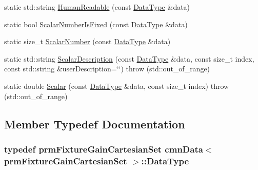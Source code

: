 \begin{DoxyCompactItemize}
\item 
static std\-::string \hyperlink{classcmn_data_3_01prm_fixture_gain_cartesian_set_01_4_a8ba414fbdc7eddcb915dcf54f9168201}{Human\-Readable} (const \hyperlink{classcmn_data_3_01prm_fixture_gain_cartesian_set_01_4_acc465bb24d169f220385b16e38a8e7ea}{Data\-Type} \&data)
\item 
static bool \hyperlink{classcmn_data_3_01prm_fixture_gain_cartesian_set_01_4_a2a449144596cb816b46b1fdacf6480ea}{Scalar\-Number\-Is\-Fixed} (const \hyperlink{classcmn_data_3_01prm_fixture_gain_cartesian_set_01_4_acc465bb24d169f220385b16e38a8e7ea}{Data\-Type} \&data)
\item 
static size\-\_\-t \hyperlink{classcmn_data_3_01prm_fixture_gain_cartesian_set_01_4_ad0e24bf44b0afb6895d09e817cfe85ec}{Scalar\-Number} (const \hyperlink{classcmn_data_3_01prm_fixture_gain_cartesian_set_01_4_acc465bb24d169f220385b16e38a8e7ea}{Data\-Type} \&data)
\item 
static std\-::string \hyperlink{classcmn_data_3_01prm_fixture_gain_cartesian_set_01_4_a02f2135145799af3c1fe4cfd641bb224}{Scalar\-Description} (const \hyperlink{classcmn_data_3_01prm_fixture_gain_cartesian_set_01_4_acc465bb24d169f220385b16e38a8e7ea}{Data\-Type} \&data, const size\-\_\-t index, const std\-::string \&user\-Description=\char`\"{}\char`\"{})  throw (std\-::out\-\_\-of\-\_\-range)
\item 
static double \hyperlink{classcmn_data_3_01prm_fixture_gain_cartesian_set_01_4_aea6db6f4eeeae19a34885ddc87f43624}{Scalar} (const \hyperlink{classcmn_data_3_01prm_fixture_gain_cartesian_set_01_4_acc465bb24d169f220385b16e38a8e7ea}{Data\-Type} \&data, const size\-\_\-t index)  throw (std\-::out\-\_\-of\-\_\-range)
\end{DoxyCompactItemize}


\subsection{Member Typedef Documentation}
\hypertarget{classcmn_data_3_01prm_fixture_gain_cartesian_set_01_4_acc465bb24d169f220385b16e38a8e7ea}{
\subsubsection[{Data\-Type}]{\setlength{\rightskip}{0pt plus 5cm}typedef {\bf prm\-Fixture\-Gain\-Cartesian\-Set} {\bf cmn\-Data}$<$ {\bf prm\-Fixture\-Gain\-Cartesian\-Set} $>$\-::{\bf Data\-Type}}}\label{classcmn_data_3_01prm_fixture_gain_cartesian_set_01_4_acc465bb24d169f220385b16e38a8e7ea}


